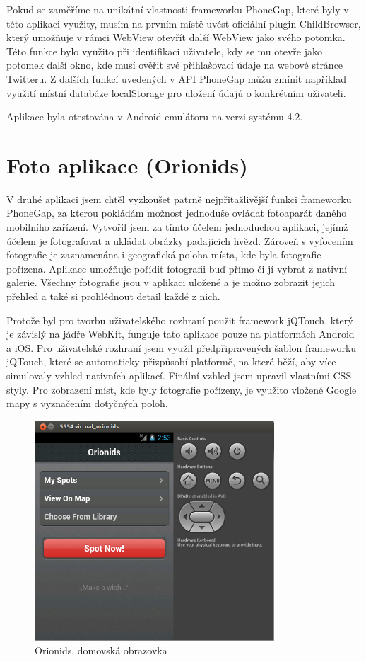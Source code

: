 Pokud se zaměříme na unikátní vlastnosti frameworku PhoneGap, které byly v této aplikaci využity, musím na prvním místě uvést oficiální plugin ChildBrowser, který umožňuje v rámci WebView otevřít další WebView jako svého potomka. Této funkce bylo využito při identifikaci uživatele, kdy se mu otevře jako potomek další okno, kde musí ověřit své přihlašovací údaje na webové stránce Twitteru. Z dalších funkcí uvedených v API PhoneGap můžu zmínit například využití místní databáze localStorage pro uložení údajů o konkrétním uživateli.

Aplikace byla otestována v Android emulátoru na verzi systému 4.2.

\section{Foto aplikace (Orionids)}
V druhé aplikaci jsem chtěl vyzkoušet patrně nejpřitažlivější funkci frameworku PhoneGap, za kterou pokládám možnost jednoduše ovládat fotoaparát daného mobilního zařízení. Vytvořil jsem za tímto účelem jednoduchou aplikaci, jejímž účelem je fotografovat a ukládat obrázky padajících hvězd. Zároveň s vyfocením fotografie je zaznamenána i geografická poloha místa, kde byla fotografie pořízena. Aplikace umožňuje pořídit fotografii buď přímo či jí vybrat z nativní galerie. Všechny fotografie jsou v aplikaci uložené a je možno zobrazit jejich přehled a také si prohlédnout detail každé z nich.

Protože byl pro tvorbu uživatelského rozhraní použit framework jQTouch, který je závislý na jádře WebKit, funguje tato aplikace pouze na platformách Android a iOS. Pro uživatelské rozhraní jsem využil předpřipravených šablon frameworku jQTouch, které se automaticky přizpůsobí platformě, na které běží, aby více simulovaly vzhled nativních aplikací. Finální vzhled jsem upravil vlastními CSS styly. Pro zobrazení míst, kde byly fotografie pořízeny, je využito vložené Google mapy s vyznačením dotyčných poloh.

\begin{figure}[H]\centering
\includegraphics[width=0.8\textwidth]{orionids_home.png}
\caption{Orionids, domovská obrazovka}
\label{fig:OrionidsHome}
\end{figure}

